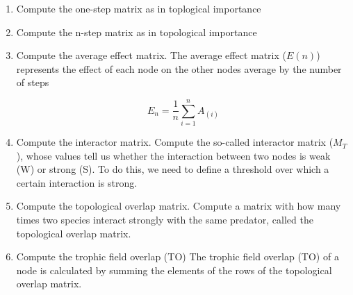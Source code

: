 \begin{enumerate}
  \item Compute the one-step matrix as in toplogical importance \item Compute the n-step matrix as in topological importance \item Compute the average effect matrix. The average effect matrix ($E(n)$) represents the effect of each node on the other nodes average by the number of steps

      \begin{equation}
        E_n=\frac{1}{n}\sum_{i=1}^{n}A_{\left(i\right)}
      \end{equation}

  \item Compute the interactor matrix.
      Compute the so-called interactor matrix ($M_T$), whose values tell us whether the interaction between two nodes is weak (W) or strong (S).
      To do this, we need to define a threshold over which a certain interaction is strong.
  \item Compute the topological overlap matrix.
      Compute a matrix with how many times two species interact strongly with the same predator, called the topological overlap matrix.
  \item Compute the trophic field overlap (TO)
      The trophic field overlap (TO) of a node is calculated by summing the elements of the rows of the topological overlap matrix.
\end{enumerate}
